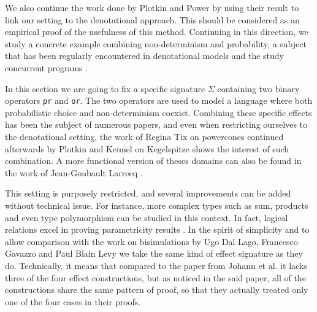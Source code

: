 We also continue the work done by Plotkin and Power \cite{plotkin2001adequacy}
by using their result to link our setting to the denotational approach. This 
should be considered as an empirical proof of the usefulness of this method. 
Continuing in this direction, we study a concrete example combining
non-determinism and probability, a subject that has been regularly encountered 
in denotational models \cite{tix2009semantic} \cite{JGL-mscs16}
\cite{KeimelP2016} and the study concurrent programs
\cite{Mislove2000} \cite{mislove2004axioms}.


In this section we are going to fix a specific signature $\Sigma$
containing two binary operators \texttt{pr} and \texttt{or}. The two
operators are used to model a language where both probabilistic choice 
and non-determinism coexist. Combining these specific effects has been 
the subject of numerous papers, and even when restricting ourselves to the 
denotational setting, the work of Regina Tix on powercones \cite{tix2009semantic} 
continued afterwards by Plotkin and Keimel \cite{KeimelP2016} on Kegelspitze
shows the interest of such combination.
A more functional version of theses domains can also be found in the work of Jean-Goubault Larrecq 
\cite{JGL-mscs16}.



This setting is purposely restricted, and several improvements can 
be added without technical issue. For instance, more complex types 
such as sum, products and even type polymorphism can be studied 
in this context. In fact, logical relations excel in proving parametricity 
results \cite{wadler1989theorems}.
In the spirit of simplicity 
and to allow comparison with the work on bisimulations by
Ugo Dal Lago, Francesco Gavazzo and Paul Blain Levy
\cite{Ugo2017} we take the same kind of effect signature 
as they do. Technically, it means that compared to 
the paper from Johann et al. \cite{gom} it lacks 
three of the four effect constructions, but as noticed 
in the said paper, all of the constructions share the
same pattern of proof, so that they actually treated 
only one of the four cases in their proofs.

